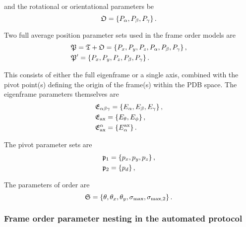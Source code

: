and the rotational or orientational parameters be
\begin{equation}
    \mathfrak{O} = \left\{ P_\alpha, P_\beta, P_\gamma \right\}.
\end{equation}

Two full average position parameter sets used in the frame order models are
\begin{subequations}
\begin{align}
    &\mathfrak{P} = \mathfrak{T} + \mathfrak{O} = \left\{ P_x, P_y, P_z, P_\alpha, P_\beta, P_\gamma \right\}, \\
    &\mathfrak{P}' = \left\{ P_x, P_y, P_z, P_\beta, P_\gamma \right\}.
\end{align}
\end{subequations}



This consists of either the full eigenframe or a single axis, combined with the pivot point(s) defining the origin of the frame(s) within the PDB space.
The eigenframe parameters themselves are
\begin{subequations}
\begin{align}
    &\mathfrak{E}_{\alpha\beta\gamma} = \left\{ E_\alpha, E_\beta, E_\gamma \right\}, \\
    &\mathfrak{E}_\textrm{ax} = \left\{ E_\theta, E_\phi \right\}, \\
    &\mathfrak{E}^\alpha_\textrm{ax} = \left\{ E_\alpha^{\textrm{ax}} \right\}.
\end{align}
\end{subequations}

The pivot parameter sets are
\begin{subequations}
\begin{align}
    &\mathfrak{p}_1 = \left\{ p_x, p_y, p_z \right\}, \\
    &\mathfrak{p}_2 = \left\{ p_d \right\},
\end{align}
\end{subequations}



The parameters of order are
\begin{equation}
    \mathfrak{S} = \left\{ \theta, \theta_x, \theta_y, \sigma_\textrm{max}, \sigma_{\textrm{max,2}} \right\}.
\end{equation}


\subsubsection{Frame order parameter nesting in the automated protocol}

